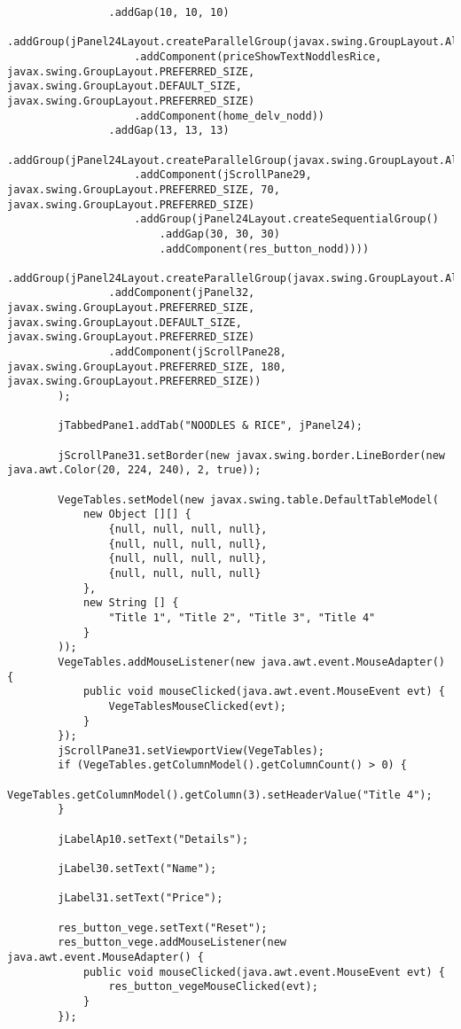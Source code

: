 \documentclass[12pt,a4paper]{article}
\begin{document}
\begin{lstlisting}
                .addGap(10, 10, 10)
                .addGroup(jPanel24Layout.createParallelGroup(javax.swing.GroupLayout.Alignment.LEADING)
                    .addComponent(priceShowTextNoddlesRice, javax.swing.GroupLayout.PREFERRED_SIZE, javax.swing.GroupLayout.DEFAULT_SIZE, javax.swing.GroupLayout.PREFERRED_SIZE)
                    .addComponent(home_delv_nodd))
                .addGap(13, 13, 13)
                .addGroup(jPanel24Layout.createParallelGroup(javax.swing.GroupLayout.Alignment.LEADING)
                    .addComponent(jScrollPane29, javax.swing.GroupLayout.PREFERRED_SIZE, 70, javax.swing.GroupLayout.PREFERRED_SIZE)
                    .addGroup(jPanel24Layout.createSequentialGroup()
                        .addGap(30, 30, 30)
                        .addComponent(res_button_nodd))))
            .addGroup(jPanel24Layout.createParallelGroup(javax.swing.GroupLayout.Alignment.TRAILING)
                .addComponent(jPanel32, javax.swing.GroupLayout.PREFERRED_SIZE, javax.swing.GroupLayout.DEFAULT_SIZE, javax.swing.GroupLayout.PREFERRED_SIZE)
                .addComponent(jScrollPane28, javax.swing.GroupLayout.PREFERRED_SIZE, 180, javax.swing.GroupLayout.PREFERRED_SIZE))
        );

        jTabbedPane1.addTab("NOODLES & RICE", jPanel24);

        jScrollPane31.setBorder(new javax.swing.border.LineBorder(new java.awt.Color(20, 224, 240), 2, true));

        VegeTables.setModel(new javax.swing.table.DefaultTableModel(
            new Object [][] {
                {null, null, null, null},
                {null, null, null, null},
                {null, null, null, null},
                {null, null, null, null}
            },
            new String [] {
                "Title 1", "Title 2", "Title 3", "Title 4"
            }
        ));
        VegeTables.addMouseListener(new java.awt.event.MouseAdapter() {
            public void mouseClicked(java.awt.event.MouseEvent evt) {
                VegeTablesMouseClicked(evt);
            }
        });
        jScrollPane31.setViewportView(VegeTables);
        if (VegeTables.getColumnModel().getColumnCount() > 0) {
            VegeTables.getColumnModel().getColumn(3).setHeaderValue("Title 4");
        }

        jLabelAp10.setText("Details");

        jLabel30.setText("Name");

        jLabel31.setText("Price");

        res_button_vege.setText("Reset");
        res_button_vege.addMouseListener(new java.awt.event.MouseAdapter() {
            public void mouseClicked(java.awt.event.MouseEvent evt) {
                res_button_vegeMouseClicked(evt);
            }
        });


\end{lstlisting}
\end{document}
